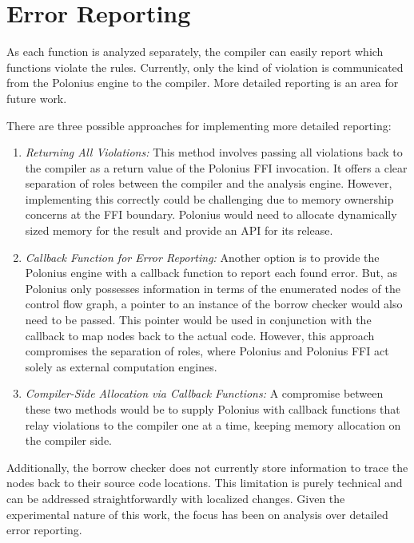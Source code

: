 \documentclass[
  11pt,
  twoside,symmetric]{report}
\begin{document}
\section{Error Reporting}\label{sec:error-reporting}

As each function is analyzed separately, the compiler can easily report
which functions violate the rules. Currently, only the kind of violation
is communicated from the Polonius engine to the compiler. More detailed
reporting is an area for future work.

There are three possible approaches for implementing more detailed
reporting:

\begin{enumerate}
\def\labelenumi{\arabic{enumi}.}
\item
  \emph{Returning All Violations:} This method involves passing all
  violations back to the compiler as a return value of the Polonius FFI
  invocation. It offers a clear separation of roles between the compiler
  and the analysis engine. However, implementing this correctly could be
  challenging due to memory ownership concerns at the FFI boundary.
  Polonius would need to allocate dynamically sized memory for the
  result and provide an API for its release.
\item
  \emph{Callback Function for Error Reporting:} Another option is to
  provide the Polonius engine with a callback function to report each
  found error. But, as Polonius only possesses information in terms of
  the enumerated nodes of the control flow graph, a pointer to an
  instance of the borrow checker would also need to be passed. This
  pointer would be used in conjunction with the callback to map nodes
  back to the actual code. However, this approach compromises the
  separation of roles, where Polonius and Polonius FFI act solely as
  external computation engines.
\item
  \emph{Compiler-Side Allocation via Callback Functions:} A compromise
  between these two methods would be to supply Polonius with callback
  functions that relay violations to the compiler one at a time, keeping
  memory allocation on the compiler side.
\end{enumerate}

Additionally, the borrow checker does not currently store information to
trace the nodes back to their source code locations. This limitation is
purely technical and can be addressed straightforwardly with localized
changes. Given the experimental nature of this work, the focus has been
on analysis over detailed error reporting.
\end{document}
